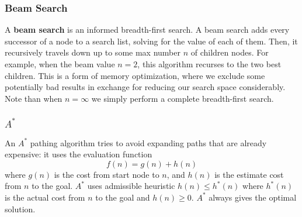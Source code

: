 \documentclass[12pt]{article}
\begin{document}
\subsubsection{Beam Search}
A {\bf beam search} is an informed breadth-first search. A beam search adds every successor of a node to a search list, solving for the value of each of them. Then, it recursively travels down up to some max number $n$ of children nodes. For example, when the beam value $n = 2$, this algorithm recurses to the two best children. This is a form of memory optimization, where we exclude some potentially bad results in exchange for reducing our search space considerably. Note than when $n = \infty$ we simply perform a complete breadth-first search.

\subsubsection{$A^*$}
An {\bf $A^*$} pathing algorithm tries to avoid expanding paths that are already expensive: it uses the evaluation function \[ f(n) = g(n) + h(n) \] where $g(n)$ is the cost from start node to $n$, and $h(n)$ is the estimate cost from $n$ to the goal. $A^*$ uses admissible heuristic $h(n) \leq h^*(n)$ where $h^*(n)$ is the actual cost from $n$ to the goal and $h(n) \geq 0$. $A^*$ always gives the optimal solution.
\end{document}

